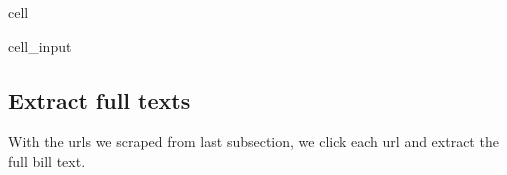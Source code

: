\documentclass[letterpaper,10pt,english]{jupyterBook}
\begin{document}
\begin{sphinxuseclass}{cell}
\begin{sphinxVerbatimInput}
\begin{sphinxuseclass}{cell_input}
\begin{sphinxVerbatim}[commandchars=\\\{\}]
\end{sphinxVerbatim}

\end{sphinxuseclass}\end{sphinxVerbatimInput}

\end{sphinxuseclass}

\subsection{Extract full texts}
\label{\detokenize{ch20:extract-full-texts}}
\sphinxAtStartPar
With the urls we scraped from last subsection, we click each url and extract the full bill text.
\end{document}
